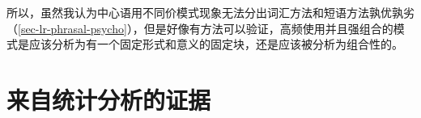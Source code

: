 \begin{exe}
\begin{xlist}[iv.]
\begin{exe}
\begin{xlist}[iv.]



所以，虽然我认为中心语用不同价模式现象无法分出词汇方法和短语方法孰优孰劣（\ref{sec-lr-phrasal-psycho}），但是好像有方法可以验证，高频使用并且强组合的模式是应该分析为有一个固定形式和意义的固定块，还是应该被分析为组合性的。

\section{来自统计分析的证据}
\label{stat-sec}


\end{xlist}
\end{exe}
\end{xlist}
\end{exe}
